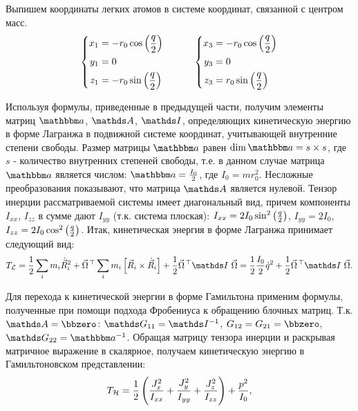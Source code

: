 Выпишем координаты легких атомов в системе координат, связанной с центром масс.
\vverh
\begin{gather}
\left\{
\begin{aligned}
x_1 &= - r_0 \cos \left( \frac{q}{2} \right) \\
y_1 &= 0 \\
z_1 &= - r_0 \sin \left( \frac{q}{2} \right) 
\end{aligned}
\right. \quad \quad \quad
\left\{
\begin{aligned}
x_3 &= - r_0 \cos \left( \frac{q}{2} \right) \\
y_3 &= 0 \\
z_3 &= r_0 \sin \left( \frac{q}{2} \right)
\end{aligned}
\right.\notag
\end{gather}

Используя формулы, приведенные в предыдущей части, получим элементы матриц $\bba$, $\bbA$, $\bbI$, определяющих кинетическую энергию в форме Лагранжа в подвижной системе координат, учитывающей внутренние степени свободы. Размер матрицы $\bba$ равен $\dim \bba = s \times s$, где $s$ - количество внутренних степеней свободы, т.е. в данном случае матрица $\bba$ является числом: $\bba = \frac{I_0}{2}$, где $I_0 = m r_0^2$. Несложные преобразования показывают, что матрица $\bbA$ является нулевой. Тензор инерции рассматриваемой системы имеет диагональный вид, причем компоненты $I_{xx}$, $I_{zz}$ в сумме дают $I_{yy}$ (т.к. система плоская): $I_{xx} = 2 I_0 \sin^2 \left( \frac{q}{2} \right)$, $I_{yy} = 2I_0$, $I_{zz} = 2I_0 \cos^2 \left( \frac{q}{2} \right)$. Итак, кинетическая энергия 
в форме Лагранжа принимает следующий вид:
\vverh
\begin{gather}
T_\mathcal{L} = \frac{1}{2} \sum_i m_i \dot{\vec{R}}_i^2 + \vec{\Omega}^{\, \top} \sum_i m_i \left[ \vec{R}_i \times \dot{\vec{R}}_i \right] + \frac{1}{2} \vec{\Omega}^{\, \top} \bbI \ \vec{\Omega} = \frac{1}{2} \frac{I_0}{2} \dot{q}^2 + \frac{1}{2} \vec{\Omega}^{\, \top} \bbI \ \vec{\Omega}. \notag
\end{gather} 

Для перехода к кинетической энергии в форме Гамильтона применим формулы, полученные при помощи подхода Фробениуса к обращению блочных матриц. Т.к. $\bbA = \bbzero$: $\bbG_{11} = \bbI^{-1}$, $G_{12} = G_{21} = \bbzero$, $\bbG_{22} = \bba^{-1}$. Обращая матрицу тензора инерции и раскрывая матричное выражение в скалярное, получаем кинетическую энергию в Гамильтоновском представлении:
\vverh
\begin{gather}
T_\mathcal{H} = \frac{1}{2} \left( \frac{J_x^2}{I_{xx}} + \frac{J_y^2}{I_{yy}} + \frac{J_z^2}{I_{zz}} \right) + \frac{p^2}{I_0}, \notag
\end{gather}

